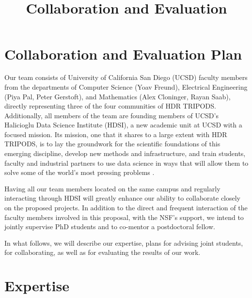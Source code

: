 \documentclass{article}
\title{Collaboration and Evaluation}
\begin{document}
\section*{Collaboration and Evaluation Plan}

Our team consists of University of California San Diego (UCSD) faculty members from the departments of Computer Science (Yoav Freund), Electrical Engineering (Piya Pal, Peter Gerstoft), and Mathematics (Alex Cloninger, Rayan Saab), directly representing three of the four communities of HDR TRIPODS.  Additionally, all members of the team are founding members of UCSD's Halicioglu Data Science Institute (HDSI), a new academic unit at UCSD with a focused mission. Its mission, one that it shares to a large extent with HDR TRIPODS, is to lay the groundwork for the scientific foundations of this emerging discipline, develop new methods and infrastructure, and train students, faculty and industrial partners to use data science in ways that will allow them to solve some of the world’s most pressing problems \cite{the HDSI website}. 

Having all our team members located on the same campus and regularly interacting through HDSI will greatly enhance our ability to collaborate closely on the proposed projects. In addition to the direct and frequent interaction of the faculty members involved in this proposal, with the NSF's support, we intend to jointly supervise PhD students and to co-mentor a postdoctoral fellow. 

In what follows, we will describe our expertise, plans for advising joint students, for collaborating, as well as for evaluating the results of our work.  
 
\section{Expertise}

\end{document}
